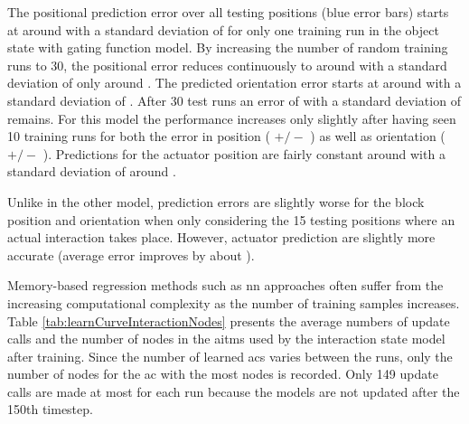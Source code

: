 The positional prediction error over all testing positions (blue error bars) starts at around  with a standard deviation of  for only one training run in the object state with gating function model. By increasing the number of random training runs to 30, the positional error reduces continuously to around  with a standard deviation of only around .
The predicted orientation error starts at around  with a standard deviation of .
After 30 test runs an error of  with a standard deviation of  remains.
For this model the performance increases only slightly after having seen 10 training runs for both the error in position ( $+/-$ ) as well as orientation ( $+/-$ ).
Predictions for the actuator position are fairly constant around  with a standard deviation of around .

Unlike in the other model, prediction errors are slightly worse for the block position and orientation when only considering the 15 testing positions where an actual interaction takes place. However, actuator prediction are slightly more accurate (average error improves by about ).

Memory-based regression methods such as \gls{nn} approaches often suffer from the increasing computational complexity as the number of training samples increases.
Table \ref{tab:learnCurveInteractionNodes} presents the average numbers of update calls and the number of nodes in the \glspl{aitm} used by the interaction state model after training. Since the number of learned \glspl{ac} varies between the runs, only the number of nodes for the \gls{ac} with the most nodes is recorded. Only 149 update calls are made at most for each run because the models are not updated after the 150th timestep.

